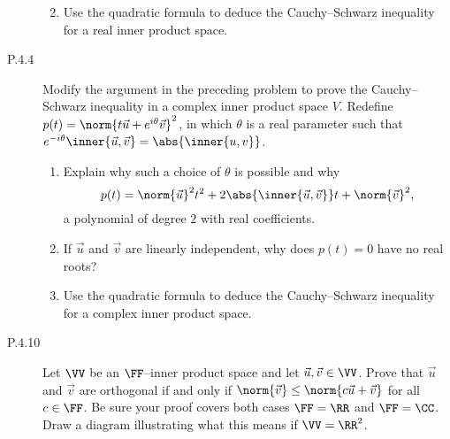 \documentclass{homework}
\begin{document}
\begin{description}
\begin{enumerate}
\begin{solution}
    \end{solution}

  \item Use the quadratic formula to deduce the Cauchy--Schwarz
    inequality for a real inner product space.

    \begin{solution}

    \end{solution}
  \end{enumerate}

\item[P.4.4]
  Modify the argument in the preceding problem to prove the
  Cauchy--Schwarz inequality in a complex inner product space \(V\).
  Redefine \(p(t) = \norm{t \vec u + e^{i\theta} \vec v}^2\), in which
  \(\theta\) is a real parameter such that
  \(e^{-i\theta} \inner{\vec u, \vec v} = \abs{\inner{u, v}}\).
  \begin{enumerate}
  \item Explain why such a choice of \(\theta\) is possible and why
    \[
      p(t) =
      \norm{\vec u}^2 t^2    +
      2 \abs{\inner{\vec u, \vec v}} t +
      \norm{\vec v}^2,
    \]
    a polynomial of degree \(2\) with real coefficients.

    \begin{solution}

    \end{solution}

  \item If \(\vec u\) and \(\vec v\) are linearly independent, why
    does \(p(t) = 0\) have no real roots?

    \begin{solution}

    \end{solution}

  \item Use the quadratic formula to deduce the Cauchy--Schwarz
    inequality for a complex inner product space.

    \begin{solution}

    \end{solution}
  \end{enumerate}

\item[P.4.10]
  Let \(\VV\) be an \(\FF\)--inner product space and let
  \(\vec u, \vec v \in \VV\).  Prove that \(\vec u\) and \(\vec v\)
  are orthogonal if and only if
  \(\norm{\vec v} \le \norm{c \vec u + \vec v}\) for all
  \(c \in \FF\).  Be sure your proof covers both cases \(\FF = \RR\)
  and \(\FF = \CC\).  Draw a diagram illustrating what this means if
  \(\VV = \RR^2\).


\end{description}
\end{document}
